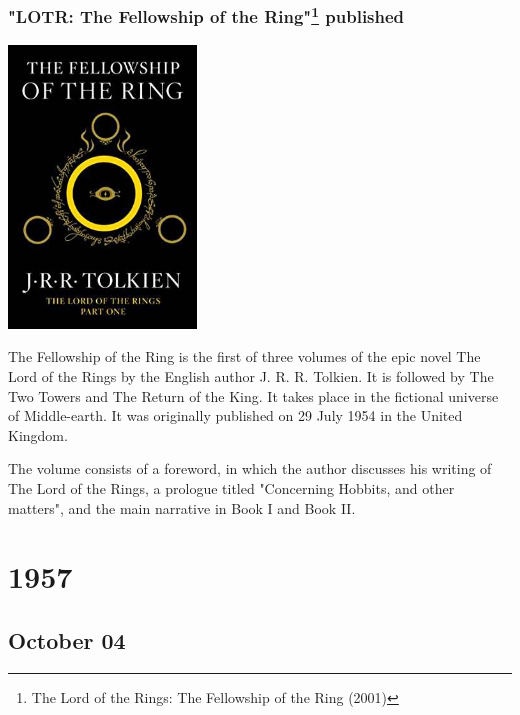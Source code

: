 \documentclass[11pt]{report}
\begin{document}
\subsection{"LOTR: The Fellowship of the Ring"\protect\footnote{The Lord of the Rings: The Fellowship of the Ring (2001)} published}
\vspace{2mm}\begin{center}\includegraphics[width=5cm]{./img/lotrbook1.jpg}\end{center}
The Fellowship of the Ring is the first of three volumes of the epic novel The Lord of the Rings by the English author J. R. R. Tolkien. It is followed by The Two Towers and The Return of the King. It takes place in the fictional universe of Middle-earth. It was originally published on 29 July 1954 in the United Kingdom.

The volume consists of a foreword, in which the author discusses his writing of The Lord of the Rings, a prologue titled "Concerning Hobbits, and other matters", and the main narrative in Book I and Book II.

\chapter{1957}
\section{October 04}
\end{document}

